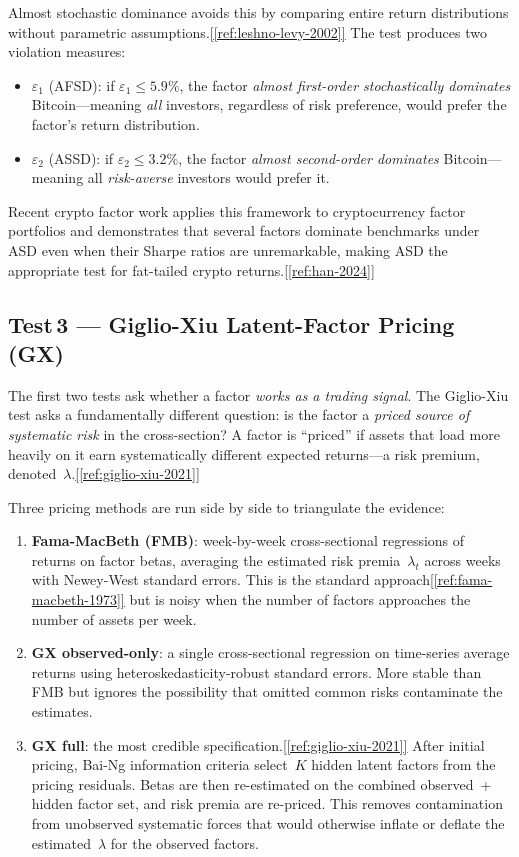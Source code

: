 \documentclass[11pt,a4paper]{article}
\newcommand{\ieeecite}[1]{\hyperref[ref:#1]{[\ref*{ref:#1}]}}
\begin{document}
Almost stochastic dominance avoids this by comparing entire return distributions without parametric assumptions.\ieeecite{leshno-levy-2002} The test produces two violation measures:

\begin{itemize}[nosep]
  \item $\varepsilon_1$ (AFSD): if $\varepsilon_1 \leq 5.9\%$, the factor \emph{almost first-order stochastically dominates} Bitcoin---meaning \emph{all} investors, regardless of risk preference, would prefer the factor's return distribution.
  \item $\varepsilon_2$ (ASSD): if $\varepsilon_2 \leq 3.2\%$, the factor \emph{almost second-order dominates} Bitcoin---meaning all \emph{risk-averse} investors would prefer it.
\end{itemize}

Recent crypto factor work applies this framework to cryptocurrency factor portfolios and demonstrates that several factors dominate benchmarks under ASD even when their Sharpe ratios are unremarkable, making ASD the appropriate test for fat-tailed crypto returns.\ieeecite{han-2024}

\subsection{Test\,3 --- Giglio-Xiu Latent-Factor Pricing (GX)}

The first two tests ask whether a factor \emph{works as a trading signal}. The Giglio-Xiu test asks a fundamentally different question: is the factor a \emph{priced source of systematic risk} in the cross-section? A factor is ``priced'' if assets that load more heavily on it earn systematically different expected returns---a risk premium, denoted~$\lambda$.\ieeecite{giglio-xiu-2021}

Three pricing methods are run side by side to triangulate the evidence:

\begin{enumerate}[nosep]
  \item \textbf{Fama-MacBeth (FMB)}: week-by-week cross-sectional regressions of returns on factor betas, averaging the estimated risk premia~$\lambda_t$ across weeks with Newey-West standard errors. This is the standard approach\ieeecite{fama-macbeth-1973} but is noisy when the number of factors approaches the number of assets per week.
  \item \textbf{GX observed-only}: a single cross-sectional regression on time-series average returns using heteroskedasticity-robust standard errors. More stable than FMB but ignores the possibility that omitted common risks contaminate the estimates.
  \item \textbf{GX full}: the most credible specification.\ieeecite{giglio-xiu-2021} After initial pricing, Bai-Ng information criteria select~$K$ hidden latent factors from the pricing residuals. Betas are then re-estimated on the combined observed~+ hidden factor set, and risk premia are re-priced. This removes contamination from unobserved systematic forces that would otherwise inflate or deflate the estimated~$\lambda$ for the observed factors.
\end{enumerate}
\end{document}
